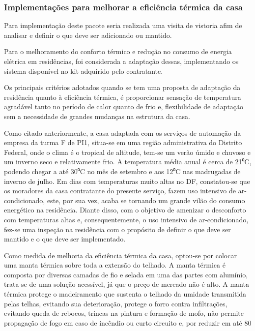 \subsubsection{Implementações para melhorar a eficiência térmica da casa}
\par Para implementação deste pacote seria realizada uma visita de vistoria afim de analisar e definir o que deve ser adicionado ou mantido.
\par Para o melhoramento do conforto térmico e redução no consumo de energia elétrica em residências, foi considerada a adaptação dessas, implementando os sistema disponível no kit adquirido pelo contratante.
\par Os principais critérios adotados quando se tem uma proposta de adaptação da residência quanto à eficiência térmica, é proporcionar sensação de temperatura agradável tanto no período de calor quanto de frio e, flexibilidade de adaptação sem a necessidade de grandes mudanças na estrutura da casa.
\par Como citado anteriormente, a casa adaptada com os serviços de automação da empresa da turma F de PI1, situa-se em uma região administrativa do Distrito Federal, onde o clima é o tropical de altitude, tem-se um verão úmido e chuvoso e um inverno seco e relativamente frio. A temperatura média anual é cerca de 21⁰C, podendo chegar a até 30⁰C no mês de setembro e aos 12⁰C nas madrugadas de inverno de julho. Em dias com temperaturas muito altas no DF, constatou-se que os moradores da casa contratante do presente serviço, fazem uso intensivo de ar-condicionado, este, por sua vez, acaba se tornando um grande vilão do consumo energético na residência. Diante disso, com o objetivo de amenizar o desconforto com temperaturas altas e, consequentemente, o uso intensivo de ar-condicionado, fez-se uma inspeção na residência com o propósito de definir o que deve ser mantido e o que deve ser implementado.
\par Como medida de melhoria da eficiência térmica da casa, optou-se por colocar uma manta térmica sobre toda a extensão do telhado. A manta térmica é composta por diversas camadas de fio e selada em uma das partes com alumínio, trata-se de uma solução acessível, já que o preço de mercado não é alto. A manta térmica protege o madeiramento que sustenta o telhado da umidade transmitida pelas telhas, evitando sua deterioração, protege o forro contra infiltrações, evitando queda de rebocos, trincas na pintura e formação de mofo, não permite propagação de fogo em caso de incêndio ou curto circuito e, por reduzir em até 80%
